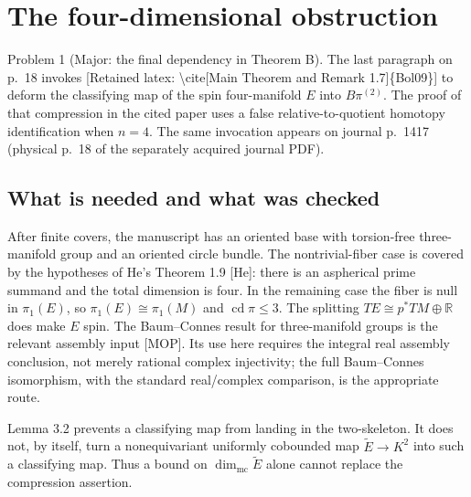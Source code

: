 \documentclass[10pt]{article}
\begin{document}
\section*{The four-dimensional obstruction}
Problem 1 (Major: the final dependency in Theorem B).  The last paragraph on p. 18 invokes [Retained latex: \textbackslash{}cite[Main Theorem and Remark 1.7]\{Bol09\}] to deform the classifying map of the spin four-manifold \(E\) into \(B\pi^{(2)}\). The proof of that compression in the cited paper uses a false relative-to-quotient homotopy identification when \(n=4\). The same invocation appears on journal p. 1417 (physical p. 18 of the separately acquired journal PDF).\par
\subsection*{What is needed and what was checked}
After finite covers, the manuscript has an oriented base with torsion-free three-manifold group and an oriented circle bundle. The nontrivial-fiber case is covered by the hypotheses of He’s Theorem 1.9 [He]: there is an aspherical prime summand and the total dimension is four. In the remaining case the fiber is null in \(\pi_1(E)\), so \(\pi_1(E)\cong\pi_1(M)\) and \(\operatorname{cd}\pi\le3\). The splitting \(TE\cong p^*TM\oplus\mathbb R\) does make \(E\) spin. The Baum–Connes result for three-manifold groups is the relevant assembly input [MOP]. Its use here requires the integral real assembly conclusion, not merely rational complex injectivity; the full Baum–Connes isomorphism, with the standard real/complex comparison, is the appropriate route.\par
Lemma 3.2 prevents a classifying map from landing in the two-skeleton. It does not, by itself, turn a nonequivariant uniformly cobounded map \(\widetilde E\to K^2\) into such a classifying map. Thus a bound on \(\dim_{\mathrm{mc}}\widetilde E\) alone cannot replace the compression assertion.\par
\end{document}
